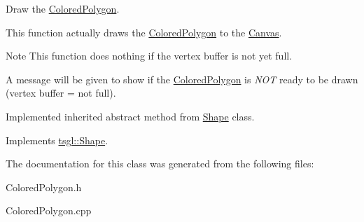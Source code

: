 Draw the \hyperlink{classtsgl_1_1_colored_polygon}{Colored\+Polygon}. 

This function actually draws the \hyperlink{classtsgl_1_1_colored_polygon}{Colored\+Polygon} to the \hyperlink{classtsgl_1_1_canvas}{Canvas}. \begin{DoxyNote}{Note}
This function does nothing if the vertex buffer is not yet full. 

A message will be given to show if the \hyperlink{classtsgl_1_1_colored_polygon}{Colored\+Polygon} is {\itshape N\+O\+T} ready to be drawn (vertex buffer = not full). 

Implemented inherited abstract method from \hyperlink{classtsgl_1_1_shape}{Shape} class. 
\end{DoxyNote}


Implements \hyperlink{classtsgl_1_1_shape_af78b1627b97d621824ce86db214e2402}{tsgl\+::\+Shape}.



The documentation for this class was generated from the following files\+:\begin{DoxyCompactItemize}
\item 
Colored\+Polygon.\+h\item 
Colored\+Polygon.\+cpp\end{DoxyCompactItemize}
